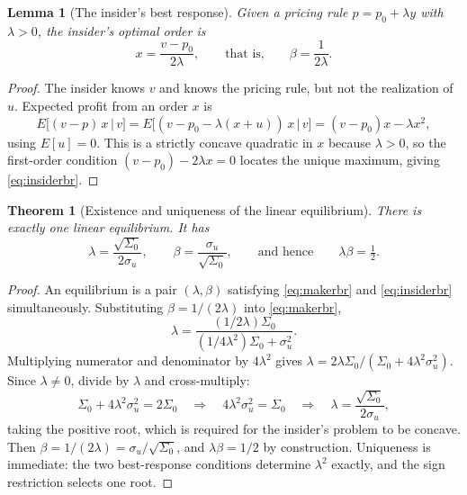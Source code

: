 \documentclass[11pt]{article}
\newtheorem{theorem}{Theorem}
\newtheorem{lemma}{Lemma}
\theoremstyle{remark}
\theoremstyle{definition}
\begin{document}
\begin{lemma}[The insider's best response]
\label{lem:insider}
Given a pricing rule $p = p_0 + \lambda y$ with $\lambda>0$, the insider's optimal order is
\begin{equation}
\label{eq:insiderbr}
x = \frac{v-p_0}{2\lambda}, \qquad\text{that is,}\qquad \beta = \frac{1}{2\lambda}.
\end{equation}
\end{lemma}

\begin{proof}
The insider knows $v$ and knows the pricing rule, but not the realization of $u$. Expected profit from an order $x$ is
\begin{equation*}
E\big[(v - p)\,x \,\big|\, v\big] = E\big[(v - p_0 - \lambda(x+u))\,x \,\big|\, v\big] = (v-p_0)x - \lambda x^2,
\end{equation*}
using $E[u]=0$. This is a strictly concave quadratic in $x$ because $\lambda>0$, so the first-order condition $(v-p_0) - 2\lambda x = 0$ locates the unique maximum, giving \eqref{eq:insiderbr}.
\end{proof}

\begin{theorem}[Existence and uniqueness of the linear equilibrium]
\label{thm:equilibrium}
There is exactly one linear equilibrium. It has
\begin{equation}
\label{eq:solution}
\lambda = \frac{\sqrt{\Sigma_0}}{2\sigma_u}, \qquad
\beta = \frac{\sigma_u}{\sqrt{\Sigma_0}}, \qquad\text{and hence}\qquad
\lambda\beta = \tfrac12 .
\end{equation}
\end{theorem}

\begin{proof}
An equilibrium is a pair $(\lambda,\beta)$ satisfying \eqref{eq:makerbr} and \eqref{eq:insiderbr} simultaneously. Substituting $\beta = 1/(2\lambda)$ into \eqref{eq:makerbr},
\begin{equation*}
\lambda = \frac{(1/2\lambda)\Sigma_0}{(1/4\lambda^2)\Sigma_0 + \sigma_u^2}.
\end{equation*}
Multiplying numerator and denominator by $4\lambda^2$ gives $\lambda = 2\lambda\Sigma_0/(\Sigma_0 + 4\lambda^2\sigma_u^2)$. Since $\lambda \ne 0$, divide by $\lambda$ and cross-multiply:
\begin{equation*}
\Sigma_0 + 4\lambda^2\sigma_u^2 = 2\Sigma_0
\quad\Longrightarrow\quad
4\lambda^2\sigma_u^2 = \Sigma_0
\quad\Longrightarrow\quad
\lambda = \frac{\sqrt{\Sigma_0}}{2\sigma_u},
\end{equation*}
taking the positive root, which is required for the insider's problem to be concave. Then $\beta = 1/(2\lambda) = \sigma_u/\sqrt{\Sigma_0}$, and $\lambda\beta = 1/2$ by construction. Uniqueness is immediate: the two best-response conditions determine $\lambda^2$ exactly, and the sign restriction selects one root.
\end{proof}
\end{document}
